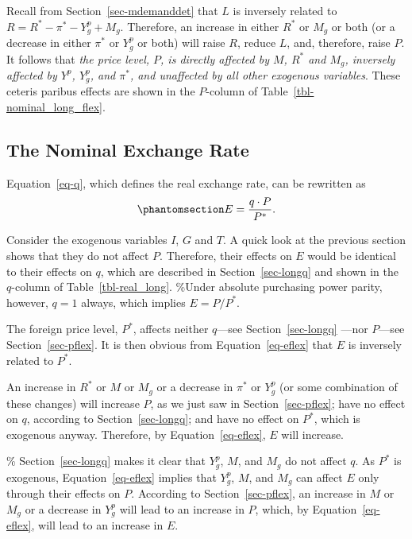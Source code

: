 \documentclass[
  letterpaper,
]{book}
\theoremstyle{plain}
\theoremstyle{remark}
\begin{document}
Recall from Section~\ref{sec-mdemanddet} that \(L\) is inversely related
to \(R=R^*-\pi^*- Y^p_g+M_g\). Therefore, an increase in either \(R^*\)
or \(M_g\) or both (or a decrease in either \(\pi^*\) or \(Y^p_g\) or
both) will raise \(R\), reduce \(L\), and, therefore, raise \(P\). It
follows that \emph{the price level, \(P\), is directly affected by
\(M\), \(R^*\) and \(M_g\), inversely affected by \(Y^p\), \(Y^p_g\),
and \(\pi^*\), and unaffected by all other exogenous variables}. These
ceteris paribus effects are shown in the \(P\)-column of
Table~\ref{tbl-nominal_long_flex}.

\subsection{The Nominal Exchange Rate}\label{sec-eflex}

Equation~\ref{eq-q}, which defines the real exchange rate, can be
rewritten as \begin{equation}\phantomsection\label{eq-eflex}{
E=\frac {q\cdot P}{P^*}.
}\end{equation}

Consider the exogenous variables \(I\), \(G\) and \(T\). A quick look at
the previous section shows that they do not affect \(P\). Therefore,
their effects on \(E\) would be identical to their effects on \(q\),
which are described in Section~\ref{sec-longq} and shown in the
\(q\)-column of Table~\ref{tbl-real_long}. \%Under absolute purchasing
power parity, however, \(q=1\) always, which implies \(E=P/P^*\).

The foreign price level, \(P^*\), affects neither \(q\)---see
Section~\ref{sec-longq} ---nor \(P\)---see Section~\ref{sec-pflex}. It
is then obvious from Equation~\ref{eq-eflex} that \(E\) is inversely
related to \(P^*\).

An increase in \(R^*\) or \(M\) or \(M_g\) or a decrease in \(\pi^*\) or
\(Y^p_g\) (or some combination of these changes) will increase \(P\), as
we just saw in Section~\ref{sec-pflex}; have no effect on \(q\),
according to Section~\ref{sec-longq}; and have no effect on \(P^*\),
which is exogenous anyway. Therefore, by Equation~\ref{eq-eflex}, \(E\)
will increase.

\% Section~\ref{sec-longq} makes it clear that \(Y^p_g\), \(M\), and
\(M_g\) do not affect \(q\). As \(P^*\) is exogenous,
Equation~\ref{eq-eflex} implies that \(Y^p_g\), \(M\), and \(M_g\) can
affect \(E\) only through their effects on \(P\). According to
Section~\ref{sec-pflex}, an increase in \(M\) or \(M_g\) or a decrease
in \(Y^p_g\) will lead to an increase in \(P\), which, by
Equation~\ref{eq-eflex}, will lead to an increase in \(E\).
\end{document}
